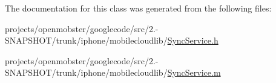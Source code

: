 \-The documentation for this class was generated from the following files\-:\begin{DoxyCompactItemize}
\item 
projects/openmobster/googlecode/src/2.-\/\-S\-N\-A\-P\-S\-H\-O\-T/trunk/iphone/mobilecloudlib/\hyperlink{_sync_service_8h}{\-Sync\-Service.\-h}\item 
projects/openmobster/googlecode/src/2.-\/\-S\-N\-A\-P\-S\-H\-O\-T/trunk/iphone/mobilecloudlib/\hyperlink{_sync_service_8m}{\-Sync\-Service.\-m}\end{DoxyCompactItemize}
